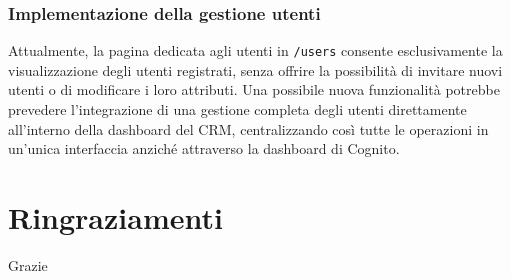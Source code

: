 \documentclass[target=bach,aauheader=,style=]{thud}
\begin{document}
\subsection{Implementazione della gestione utenti}
Attualmente, la pagina dedicata agli utenti in \texttt{/users} consente esclusivamente la visualizzazione degli utenti registrati, senza offrire la possibilità di invitare nuovi utenti o di modificare i loro attributi. Una possibile nuova funzionalità potrebbe prevedere l'integrazione di una gestione completa degli utenti direttamente all'interno della dashboard del CRM, centralizzando così tutte le operazioni in un'unica interfaccia anziché attraverso la dashboard di Cognito.


\chapter{Ringraziamenti}
Grazie






\end{document}
